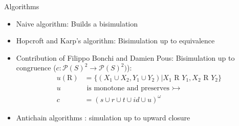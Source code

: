 \begin{frame}{Algorithms}
  \begin{itemize}
    \item Naive algorithm: Builds a bisimulation
    \item Hopcroft and Karp's algorithm\cite{hopcroft1971linear}: Bisimulation up to equivalence
    \item Contribution of Filippo Bonchi and Damien Pous\cite{bonchi2013checking}:
      Bisimulation up to congruence ($c : \mathcal{P}(S)^2 \to \mathcal{P}(S)^2)$):\\
        \begin{align}
          u(\text{R}) &= \{(X_1 \cup X_2, Y_1 \cup Y_2) | X_1 \text{ R } Y_1, X_2 \text{ R } Y_2\}\\
          u&\text{ is monotone and preserves }\rightarrowtail\\
          c &= (s \cup r \cup t \cup id \cup u)^\omega
        \end{align}
    \item Antichain algorithms
      \cite{doyen2010antichain}\cite{abdulla2010simulation}\cite{lengal2012vata}:
      simulation up to upward closure
  \end{itemize}
\end{frame}
